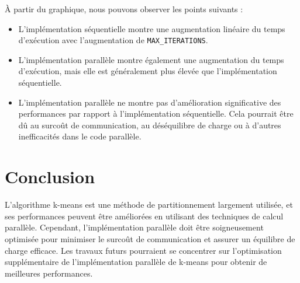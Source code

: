 \documentclass{article}
\begin{document}
À partir du graphique, nous pouvons observer les points suivants :
\begin{itemize}
    \item L'implémentation séquentielle montre une augmentation linéaire du temps d'exécution avec l'augmentation de \texttt{MAX\_ITERATIONS}.
    \item L'implémentation parallèle montre également une augmentation du temps d'exécution, mais elle est généralement plus élevée que l'implémentation séquentielle.
    \item L'implémentation parallèle ne montre pas d'amélioration significative des performances par rapport à l'implémentation séquentielle. Cela pourrait être dû au surcoût de communication, au déséquilibre de charge ou à d'autres inefficacités dans le code parallèle.
\end{itemize}

\section{Conclusion}
L'algorithme k-means est une méthode de partitionnement largement utilisée, et ses performances peuvent être améliorées en utilisant des techniques de calcul parallèle. Cependant, l'implémentation parallèle doit être soigneusement optimisée pour minimiser le surcoût de communication et assurer un équilibre de charge efficace. Les travaux futurs pourraient se concentrer sur l'optimisation supplémentaire de l'implémentation parallèle de k-means pour obtenir de meilleures performances.
\end{document}
